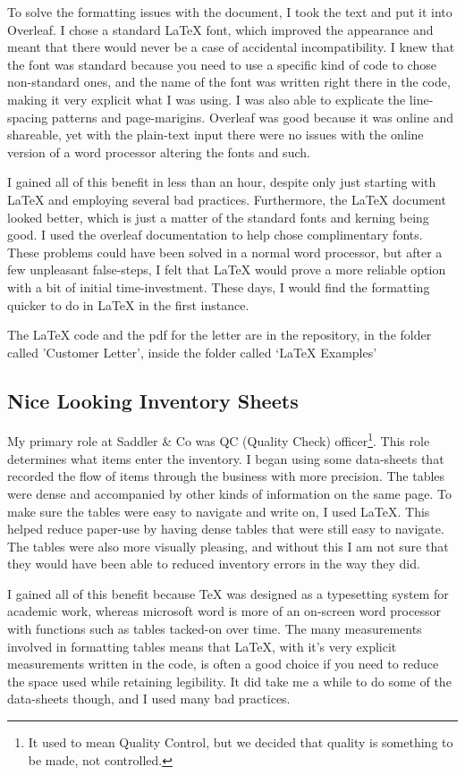 \documentclass[12pt, oneside]{memoir}
\begin{document}
To solve the formatting issues with the document, I took the text and put it into Overleaf. I chose a standard \LaTeX{} font, which improved the appearance and meant that there would never be a case of accidental incompatibility. I knew that the font was standard because you need to use a specific kind of code to chose non-standard ones, and the name of the font was written right there in the code, making it very explicit what I was using. I was also able to explicate the line-spacing patterns and page-marigins. Overleaf was good because it was online and shareable, yet with the plain-text input there were no issues with the online version of a word processor altering the fonts and such.

I gained all of this benefit in less than an hour, despite only just starting with \LaTeX{} and employing several bad practices. Furthermore, the \LaTeX{} document looked better, which is just a matter of the standard fonts and kerning being good. I used the overleaf documentation to help chose complimentary fonts. These problems could have been solved in a normal word processor, but after a few unpleasant false-steps, I felt that \LaTeX{} would prove a more reliable option with a bit of initial time-investment. These days, I would find the formatting quicker to do in LaTeX in the first instance.

The LaTeX code and the pdf for the letter are in the repository, in the folder called 'Customer Letter', inside the folder called `LaTeX Examples'

\subsection{Nice Looking Inventory Sheets}
My primary role at Saddler \& Co was QC (Quality Check) officer\footnote{It used to mean Quality Control, but we decided that quality is something to be made, not controlled.}. This role determines what items enter the inventory. I began using some data-sheets that recorded the flow of items through the business with more precision. The tables were dense and accompanied by other kinds of information on the same page. To make sure the tables were easy to navigate and write on, I used \LaTeX{}. This helped reduce paper-use by having dense tables that were still easy to navigate. The tables were also more visually pleasing, and without this I am not sure that they would have been able to reduced inventory errors in the way they did.

I gained all of this benefit because \TeX{} was designed as a typesetting system for academic work, whereas microsoft word is more of an on-screen word processor with functions such as tables tacked-on over time. The many measurements involved in formatting tables means that \LaTeX{}, with it's very explicit measurements written in the code, is often a good choice if you need to reduce the space used while retaining legibility. It did take me a while to do some of the data-sheets though, and I used many bad practices.
\end{document}
